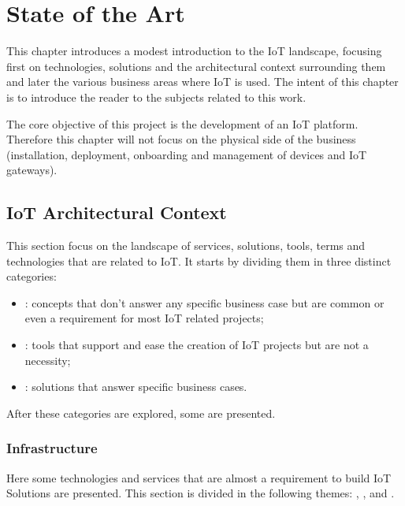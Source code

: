 \chapter{State of the Art}
\label{chap:stateofart}

This chapter introduces a modest introduction to the \gls{IoT} landscape, focusing first on technologies, solutions and the architectural context surrounding them and later the various business areas where \gls{IoT} is used.
The intent of this chapter is to introduce the reader to the subjects related to this work.

The core objective of this project is the development of an \gls{IoT} platform. Therefore this chapter will not focus on the physical side of the business (installation, deployment, onboarding and management of devices and \gls{IoT} gateways).

\section{IoT Architectural Context}
\label{sec:stateofart:arch}

This section focus on the landscape of services, solutions, tools, terms and technologies that are related to \gls{IoT}.
It starts by dividing them in three distinct categories:

\begin{itemize}
    \item {}: concepts that don't answer any specific business case but are common or even a requirement for most \gls{IoT} related projects; 
    \item {}: tools that support and ease the creation of \gls{IoT} projects but are not a necessity;
    \item {}: solutions that answer specific business cases.
\end{itemize}

After these categories are explored, some  are presented.

\subsection{Infrastructure} %
\label{subsec:stateofart:arch:infra}

Here some technologies and services that are almost a requirement to build \gls{IoT} Solutions are presented. This section is divided in the following themes: , ,  and .

